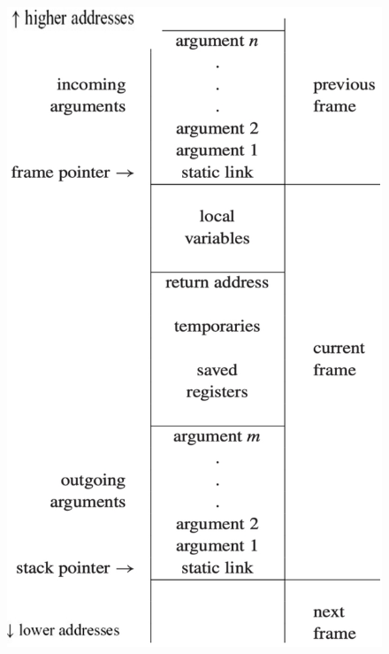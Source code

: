 \begin{figure}[H]
    \centering
    \includegraphics[angle=90, width=0.8\linewidth]{figures/ar2.png}
\end{figure}